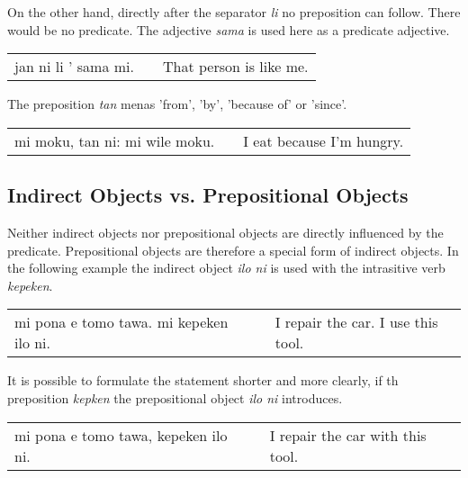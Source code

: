 On the other hand, directly after the separator \textit{li} no preposition can follow. 
There would be no predicate. 
The adjective \textit{sama} is used here as a predicate adjective. 

\begin{supertabular}{p{5,5cm}|ll}
jan ni li ' sama mi. && That person is like me. \\
\end{supertabular} 

%

The preposition \textit{tan} menas 'from', 'by', 'because of' or 'since'.

\begin{supertabular}{p{5,5cm}|ll}
mi moku, tan ni: mi wile moku. &&  I eat because I'm hungry. \\
\end{supertabular} 

%
\subsection*{Indirect Objects vs. Prepositional Objects}
%
%

Neither indirect objects nor prepositional objects are directly influenced by the predicate. 
Prepositional objects are therefore a special form of indirect objects. 
In the following example the indirect object \textit{ilo ni} is used with the intrasitive verb \textit{kepeken}.

\begin{supertabular}{p{5,5cm}|ll}
mi pona e tomo tawa. mi kepeken ilo ni. && I repair the car. I use this tool. \\
\end{supertabular} 

It is possible to formulate the statement shorter and more clearly, if th preposition \textit{kepken} the prepositional object \textit{ilo ni} introduces. 

\begin{supertabular}{p{5,5cm}|ll}
mi pona e tomo tawa, kepeken ilo ni. && I repair the car with this tool. \\
\end{supertabular} 

